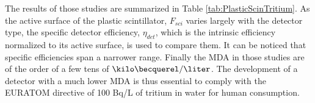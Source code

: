 The results of those studies are summarized in Table \ref{tab:PlasticScinTritium}. As the active surface of the plastic scintillator, $F_{sci}$ varies largely with the detector type, the specific detector efficiency, $\eta_{det}$, which is the intrinsic efficiency normalized to its active surface, is used to compare them. It can be noticed that specific efficiencies span a narrower range. Finally the MDA in those studies are of the order of a few tens of $\kilo\becquerel/\liter$. The development of a detector with a much lower MDA is thus essential to comply with the EURATOM directive of 100 Bq/L of tritium in water for human consumption.